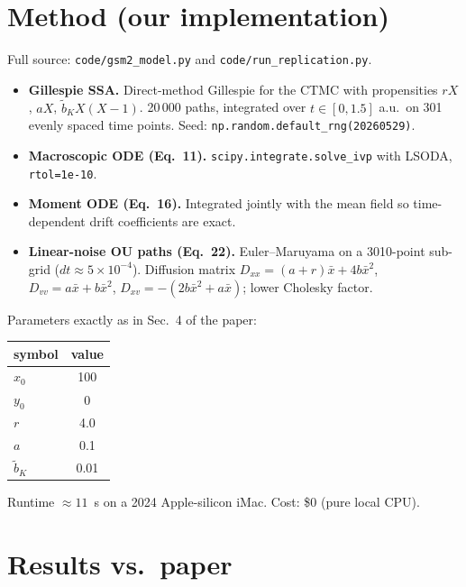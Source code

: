 \documentclass[11pt]{article}
\begin{document}
\section{Method (our implementation)}

Full source: \verb|code/gsm2_model.py| and \verb|code/run_replication.py|.
\begin{itemize}
  \item \textbf{Gillespie SSA.} Direct-method Gillespie for the CTMC with propensities $r X$, $a X$, $\tilde b_K X(X-1)$.  20\,000 paths, integrated over $t\in[0,1.5]$ a.u.\ on 301 evenly spaced time points.  Seed: \verb|np.random.default_rng(20260529)|.
  \item \textbf{Macroscopic ODE (Eq.~11).}  \verb|scipy.integrate.solve_ivp| with LSODA, \verb|rtol=1e-10|.
  \item \textbf{Moment ODE (Eq.~16).}  Integrated jointly with the mean field so time-dependent drift coefficients are exact.
  \item \textbf{Linear-noise OU paths (Eq.~22).}  Euler--Maruyama on a 3010-point sub-grid ($dt \approx 5\times 10^{-4}$).  Diffusion matrix $D_{xx}=(a+r)\bar x+4b\bar x^2$, $D_{vv}=a\bar x+b\bar x^2$, $D_{xv}=-(2b\bar x^2+a\bar x)$; lower Cholesky factor.
\end{itemize}
Parameters exactly as in Sec.~4 of the paper:
\begin{center}
\begin{tabular}{lc}\toprule
symbol & value \\ \midrule
$x_0$ & 100 \\ $y_0$ & 0 \\ $r$ & 4.0 \\ $a$ & 0.1 \\ $\tilde b_K$ & 0.01 \\
\bottomrule
\end{tabular}
\end{center}
Runtime $\approx 11$~s on a 2024 Apple-silicon iMac.  Cost: \$0 (pure local CPU).

\section{Results vs.\ paper}
\end{document}
